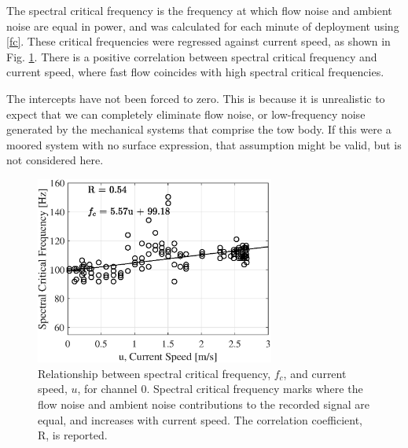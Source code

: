 \documentclass[12pt,journal,onecolumn]{IEEEtran}
\begin{document}
The spectral critical frequency is the frequency at which flow noise and ambient noise are equal in power, and was calculated for each minute of deployment using \eqref{fc}. These critical frequencies were regressed against current speed, as shown in Fig. \ref{f:thresh}. There is a positive correlation between spectral critical frequency and current speed, where fast flow coincides with high spectral critical frequencies. 

The intercepts have not been forced to zero. This is because it is unrealistic to expect that we can completely eliminate flow noise, or low-frequency noise generated by the mechanical systems that comprise the tow body. If this were a moored system with no surface expression, that assumption might be valid, but is not considered here. 
\begin{figure}[!t]
	\begin{center}
		\includegraphics[width=0.7\textwidth]{figure4.eps}
	\end{center}
	\caption[Spectral slope thresholding results]{
	\label{f:thresh}
	Relationship between spectral critical frequency, $f_c$, and current speed, $u$, for channel 0. Spectral critical frequency marks where the flow noise and ambient noise contributions to the recorded signal are equal, and increases with current speed. The correlation coefficient, R, is reported.}
\end{figure}
\end{document}
